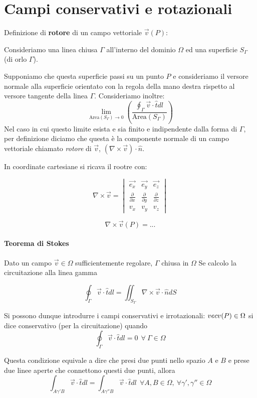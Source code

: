 \section{Campi conservativi e rotazionali}
Definizione di \textbf{rotore} di un campo vettoriale $\vec{v}(P)$:

Consideriamo una linea chiusa $\Gamma$ all'interno del dominio $\Omega$ ed una superficie
$S_\Gamma$ (di orlo $\Gamma$).

Supponiamo che questa superficie passi su un punto $P$ e consideriamo il versore normale alla 
superficie orientato con la regola della mano destra rispetto al versore tangente della linea $\Gamma$.
Consideriamo inoltre:
$$
\lim_{\text{Area}(S_\Gamma)\to 0}\left(\frac{\oint_{\Gamma} \vec{v}\cdot\hat{t}dl}{\text{Area}(S_\Gamma)}\right)
$$
Nel caso in cui questo limite esista e sia finito e indipendente dalla forma di $\Gamma$, per definizione
diciamo che questa è la componente normale di un campo vettoriale chiamato \textit{rotore} di $\vec{v}$,
$(\nabla \times \vec{v})\cdot \hat{n}$.

In coordinate cartesiane si ricava il rootre con:

$$
\nabla \times \vec{v} =
\begin{vmatrix}
\vec{e_x} & \vec{e_y} & \vec{e_z} \\
\frac{\partial}{\partial x} & \frac{\partial}{\partial y} & \frac{\partial}{\partial z} \\
v_x & v_y & v_z
\end{vmatrix}
$$

$$
\nabla\times{\vec{v}}(P) = ...
$$

\paragraph{Teorema di Stokes}
Dato un campo $\vec{v} \in \Omega$ sufficientemente regolare, $\Gamma$ chiusa in $\Omega$
Se calcolo la circuitazione alla linea gamma

$$
\oint_\Gamma \vec{v}\cdot\hat{t} dl = \iint_{S_\Gamma} \nabla\times \vec{v} \cdot \hat{n} dS
$$

Si possono dunque introdurre i campi conservativi e irrotazionali:
$\\vec{v}(P) \in \Omega$ si dice conservativo (per la circuitazione) quando
$$
\oint_\Gamma \vec{v}\cdot\hat{t} dl = 0\ \ \forall\ \Gamma \in \Omega
$$

Questa condizione equivale a dire che presi due punti nello spazio $A$ e $B$ e prese due linee aperte che connettono questi due punti, allora
$$
\int_{A\gamma'B} \vec{v}\cdot\hat{t}dl = \int_{A\gamma''B} \vec{v}\cdot\hat{t}dl\ \ \forall A,B\in\Omega,\ \forall \gamma',\gamma'' \in \Omega
$$

